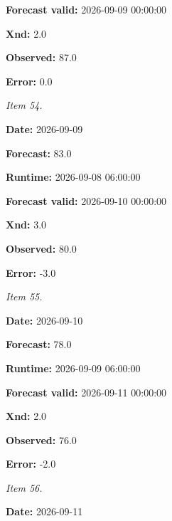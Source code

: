 \documentclass[11pt]{article}
\begin{document}
\par\noindent\textbf{Forecast valid:} 2026-09-09 00:00:00

\par\noindent\textbf{Xnd:} 2.0

\par\noindent\textbf{Observed:} 87.0

\par\noindent\textbf{Error:} 0.0

\par\noindent\textit{Item 54.}\par \par\noindent\textbf{Date:} 2026-09-09

\par\noindent\textbf{Forecast:} 83.0

\par\noindent\textbf{Runtime:} 2026-09-08 06:00:00

\par\noindent\textbf{Forecast valid:} 2026-09-10 00:00:00

\par\noindent\textbf{Xnd:} 3.0

\par\noindent\textbf{Observed:} 80.0

\par\noindent\textbf{Error:} -3.0

\par\noindent\textit{Item 55.}\par \par\noindent\textbf{Date:} 2026-09-10

\par\noindent\textbf{Forecast:} 78.0

\par\noindent\textbf{Runtime:} 2026-09-09 06:00:00

\par\noindent\textbf{Forecast valid:} 2026-09-11 00:00:00

\par\noindent\textbf{Xnd:} 2.0

\par\noindent\textbf{Observed:} 76.0

\par\noindent\textbf{Error:} -2.0

\par\noindent\textit{Item 56.}\par \par\noindent\textbf{Date:} 2026-09-11
\end{document}
